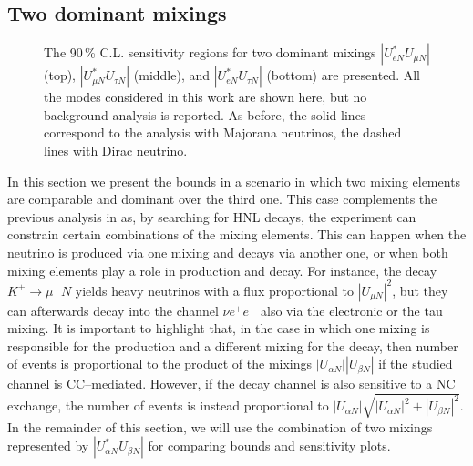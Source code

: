 \subsection{Two dominant mixings}
\label{sec:bimax}

\begin{figure}
	\centering
	\vspace{0.05em}

	\vspace{0.05em}

	\footnotesize
	\caption{The 90\,\% C.L. sensitivity regions for two dominant mixings %
		$|U_{e N}^* U_{\mu N}|$ (top), $|U_{\mu N}^* U_{\tau N}|$ (middle), and $|U_{e N}^* U_{\tau N}|$ (bottom) are presented.
		All the modes considered in this work are shown here, but no background analysis is reported.
		As before, the solid lines correspond to the analysis with Majorana neutrinos, the dashed lines with Dirac neutrino.}
	\label{fig:senseMix}
\end{figure}

In this section we present the bounds in a scenario in which two mixing elements are comparable and dominant over the third one.
This case complements the previous analysis in  as, by searching for HNL decays, %
the experiment can constrain certain combinations of the mixing elements.
This can happen when the neutrino is produced via one mixing and decays via another one, %
or when both mixing elements play a role in production and decay.
For instance, the decay $K^+ \to \mu^+ N$ yields heavy neutrinos with a flux proportional to %
$|U_{\mu N}|^2$, but they can afterwards decay into the channel $\nu e^+ e^-$ also via the electronic or the tau mixing.
It is important to highlight that, in the case in which one mixing is responsible for the production and a different mixing for the decay, %
then number of events is proportional to the product of the mixings $|U_{\alpha N}||U_{\beta N}|$ if the studied channel is CC--mediated.
However, if the decay channel is also sensitive to a NC exchange, the number of events is instead proportional to %
$|U_{\alpha N}|\sqrt{|U_{\alpha N}|^2 + |U_{\beta N}|^2}$.
In the remainder of this section, we will use the combination of two mixings represented by $|U_{\alpha N}^* U_{\beta N}|$ %
\enlargethispage{\baselineskip}
for comparing bounds and sensitivity plots.

